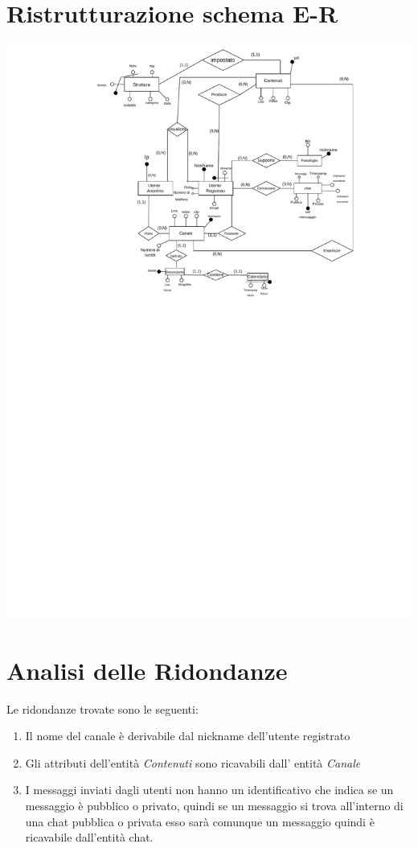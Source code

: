 \section{Ristrutturazione schema E-R}
\includegraphics[width=\textwidth]{resources/e_r-ridotto.pdf}

\section{Analisi delle Ridondanze}
Le ridondanze trovate sono le seguenti:
\begin{enumerate}
    \item Il nome del canale è derivabile dal nickname dell'utente registrato
    \item Gli attributi dell'entità \textit{Contenuti} sono ricavabili dall' entità \textit{Canale}
    \item I messaggi inviati dagli utenti non hanno un identificativo che indica se un messaggio è pubblico o privato, quindi se un messaggio si trova all'interno di una
          chat pubblica o privata esso sarà comunque un messaggio quindi è ricavabile dall'entità chat. 
\end{enumerate}
